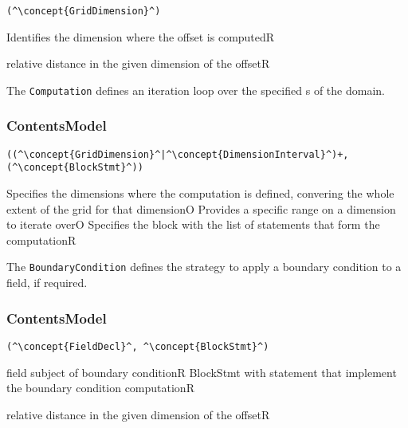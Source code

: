 \begin{lstlisting}[style=default,frame=none]
(^\concept{GridDimension}^)
\end{lstlisting}

\begin{HIRChildElements}
	{Identifies the dimension where the offset is computed}{R}
\end{HIRChildElements}

\begin{HIRAttributes}
	{relative distance in the given dimension of the offset}{R}
\end{HIRAttributes}

The {\tt Computation} defines an iteration loop over the specified s of the domain.

\subsubsection*{ContentsModel}{}

\begin{lstlisting}[style=default,frame=none]
((^\concept{GridDimension}^|^\concept{DimensionInterval}^)+,(^\concept{BlockStmt}^))
\end{lstlisting}

\begin{HIRChildElements}
	{Specifies the dimensions where the computation is defined,
		convering the whole extent of the grid for that dimension}{O}
	{Provides a specific range on a dimension to iterate over}{O}
	{Specifies the block with the list of statements that form the computation}{R}
\end{HIRChildElements}


The {\tt BoundaryCondition} defines the strategy to apply a boundary condition to a field, if required.

\subsubsection*{ContentsModel}{}

\begin{lstlisting}[style=default,frame=none]
(^\concept{FieldDecl}^, ^\concept{BlockStmt}^)
\end{lstlisting}

\begin{HIRChildElements}
	{field subject of boundary condition}{R}
	{BlockStmt with statement that implement the boundary condition computation}{R}
\end{HIRChildElements}

\begin{HIRAttributes}
	{relative distance in the given dimension of the offset}{R}
\end{HIRAttributes}
